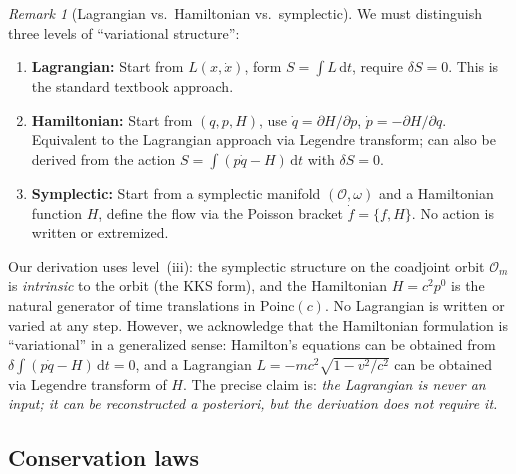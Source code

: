 \documentclass[12pt]{article}
\theoremstyle{plain}
\theoremstyle{definition}
\theoremstyle{remark}
\newtheorem{remark}[theorem]{Remark}
\newcommand{\Poinc}{\mathrm{Poinc}}
\newcommand{\dd}{\mathrm{d}}
\begin{document}
\begin{remark}[Lagrangian vs.\ Hamiltonian vs.\ symplectic]\label{rmk:not-variational}
We must distinguish three levels of ``variational structure'':
\begin{enumerate}[label=(\roman*)]
    \item \textbf{Lagrangian:} Start from $L(x, \dot{x})$, form $S = \int L\,\dd t$, require $\delta S = 0$. This is the standard textbook approach.
    \item \textbf{Hamiltonian:} Start from $(q, p, H)$, use $\dot{q} = \partial H/\partial p$, $\dot{p} = -\partial H/\partial q$. Equivalent to the Lagrangian approach via Legendre transform; can also be derived from the action $S = \int(p\dot{q} - H)\,\dd t$ with $\delta S = 0$.
    \item \textbf{Symplectic:} Start from a symplectic manifold $(\mathcal{O}, \omega)$ and a Hamiltonian function $H$, define the flow via the Poisson bracket $\dot{f} = \{f, H\}$. No action is written or extremized.
\end{enumerate}
Our derivation uses level~(iii): the symplectic structure on the coadjoint orbit $\mathcal{O}_m$ is \emph{intrinsic} to the orbit (the KKS form), and the Hamiltonian $H = c^2 p^0$ is the natural generator of time translations in $\Poinc(c)$. No Lagrangian is written or varied at any step. However, we acknowledge that the Hamiltonian formulation is ``variational'' in a generalized sense: Hamilton's equations can be obtained from $\delta\int(p\dot{q} - H)\,\dd t = 0$, and a Lagrangian $L = -mc^2\sqrt{1 - v^2/c^2}$ can be obtained via Legendre transform of $H$. The precise claim is: \emph{the Lagrangian is never an input; it can be reconstructed a posteriori, but the derivation does not require it.}
\end{remark}

\subsection{Conservation laws}
\end{document}
